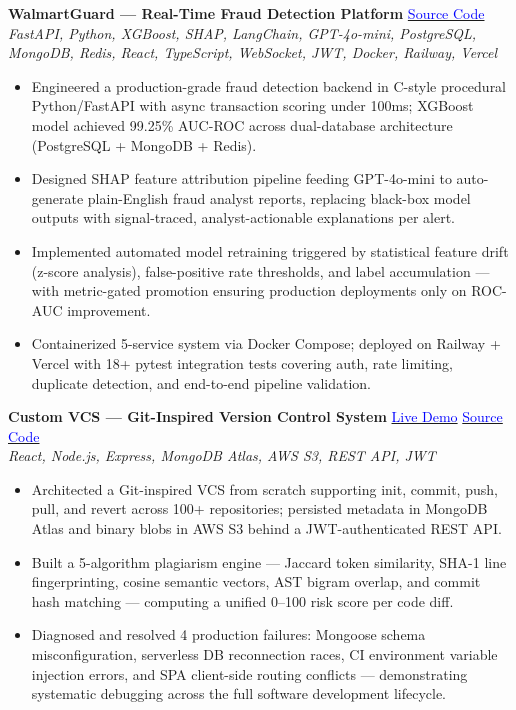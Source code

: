 \documentclass[10pt,letterpaper]{article}
\begin{document}
\textbf{WalmartGuard --- Real-Time Fraud Detection Platform} \hfill \href{https://github.com/TechieLukesh/WalmartML}{\textcolor{blue}{Source Code}}\\
\textit{FastAPI, Python, XGBoost, SHAP, LangChain, GPT-4o-mini, PostgreSQL, MongoDB, Redis, React, TypeScript, WebSocket, JWT, Docker, Railway, Vercel}
\begin{itemize}[leftmargin=10pt,itemsep=0pt,parsep=0pt,topsep=0pt]
    \item Engineered a production-grade fraud detection backend in C-style procedural Python/FastAPI with async transaction scoring under 100ms; XGBoost model achieved 99.25\% AUC-ROC across dual-database architecture (PostgreSQL + MongoDB + Redis).
    \item Designed SHAP feature attribution pipeline feeding GPT-4o-mini to auto-generate plain-English fraud analyst reports, replacing black-box model outputs with signal-traced, analyst-actionable explanations per alert.
    \item Implemented automated model retraining triggered by statistical feature drift (z-score analysis), false-positive rate thresholds, and label accumulation --- with metric-gated promotion ensuring production deployments only on ROC-AUC improvement.
    \item Containerized 5-service system via Docker Compose; deployed on Railway + Vercel with 18+ pytest integration tests covering auth, rate limiting, duplicate detection, and end-to-end pipeline validation.
\end{itemize}

\vspace{2pt}

\textbf{Custom VCS --- Git-Inspired Version Control System} \hfill \href{https://frontend-main-dun.vercel.app}{\textcolor{blue}{Live Demo}} \hspace{10pt} \href{https://github.com/variantbyx/versionControl}{\textcolor{blue}{Source Code}}\\
\textit{React, Node.js, Express, MongoDB Atlas, AWS S3, REST API, JWT}
\begin{itemize}[leftmargin=10pt,itemsep=0pt,parsep=0pt,topsep=0pt]
    \item Architected a Git-inspired VCS from scratch supporting init, commit, push, pull, and revert across 100+ repositories; persisted metadata in MongoDB Atlas and binary blobs in AWS S3 behind a JWT-authenticated REST API.
    \item Built a 5-algorithm plagiarism engine --- Jaccard token similarity, SHA-1 line fingerprinting, cosine semantic vectors, AST bigram overlap, and commit hash matching --- computing a unified 0--100 risk score per code diff.
    \item Diagnosed and resolved 4 production failures: Mongoose schema misconfiguration, serverless DB reconnection races, CI environment variable injection errors, and SPA client-side routing conflicts --- demonstrating systematic debugging across the full software development lifecycle.
\end{itemize}
\end{document}

